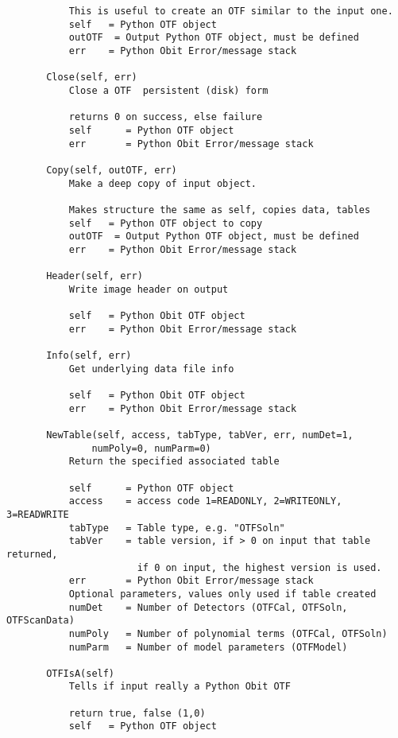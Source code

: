 \documentclass[11pt]{report}
\begin{document}
\begin{verbatim}
           This is useful to create an OTF similar to the input one.
           self   = Python OTF object
           outOTF  = Output Python OTF object, must be defined
           err    = Python Obit Error/message stack
       
       Close(self, err)
           Close a OTF  persistent (disk) form
           
           returns 0 on success, else failure
           self      = Python OTF object
           err       = Python Obit Error/message stack
       
       Copy(self, outOTF, err)
           Make a deep copy of input object.
           
           Makes structure the same as self, copies data, tables
           self   = Python OTF object to copy
           outOTF  = Output Python OTF object, must be defined
           err    = Python Obit Error/message stack
       
       Header(self, err)
           Write image header on output
           
           self   = Python Obit OTF object
           err    = Python Obit Error/message stack
       
       Info(self, err)
           Get underlying data file info
           
           self   = Python Obit OTF object
           err    = Python Obit Error/message stack
       
       NewTable(self, access, tabType, tabVer, err, numDet=1, 
               numPoly=0, numParm=0)
           Return the specified associated table
           
           self      = Python OTF object
           access    = access code 1=READONLY, 2=WRITEONLY, 3=READWRITE
           tabType   = Table type, e.g. "OTFSoln"
           tabVer    = table version, if > 0 on input that table returned,
                       if 0 on input, the highest version is used.
           err       = Python Obit Error/message stack
           Optional parameters, values only used if table created
           numDet    = Number of Detectors (OTFCal, OTFSoln, OTFScanData)
           numPoly   = Number of polynomial terms (OTFCal, OTFSoln)
           numParm   = Number of model parameters (OTFModel)
       
       OTFIsA(self)
           Tells if input really a Python Obit OTF
           
           return true, false (1,0)
           self   = Python OTF object
       

\end{verbatim}
\end{document}
